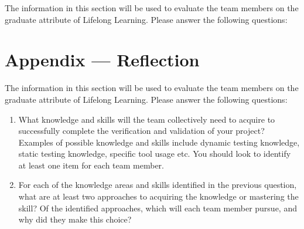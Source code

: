 \documentclass[12pt, titlepage]{article}
\begin{document}
The information in this section will be used to evaluate the team members on the
graduate attribute of Lifelong Learning.  Please answer the following questions:

\newpage{}
\section*{Appendix --- Reflection}


The information in this section will be used to evaluate the team members on the
graduate attribute of Lifelong Learning.  Please answer the following questions:

\begin{enumerate}
  \item What knowledge and skills will the team collectively need to acquire to
  successfully complete the verification and validation of your project?
  Examples of possible knowledge and skills include dynamic testing knowledge,
  static testing knowledge, specific tool usage etc.  You should look to
  identify at least one item for each team member.
  \item For each of the knowledge areas and skills identified in the previous
  question, what are at least two approaches to acquiring the knowledge or
  mastering the skill?  Of the identified approaches, which will each team
  member pursue, and why did they make this choice?
\end{enumerate}
\end{document}
